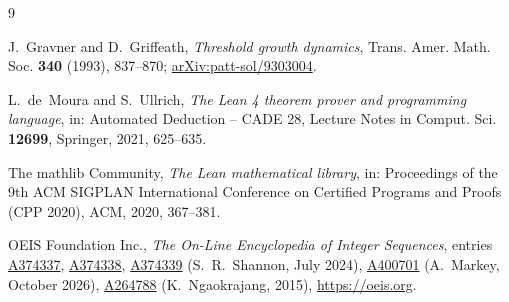 \documentclass[11pt,a4paper]{amsart}
\theoremstyle{definition}
\theoremstyle{remark}
\newcommand{\oeis}[1]{\href{https://oeis.org/#1}{#1}}
\begin{document}
\begin{thebibliography}{9}

J.~Gravner and D.~Griffeath,
\emph{Threshold growth dynamics},
Trans. Amer. Math. Soc. \textbf{340} (1993), 837--870;
\href{https://arxiv.org/abs/patt-sol/9303004}{arXiv:patt-sol/9303004}.

L.~de~Moura and S.~Ullrich,
\emph{The Lean 4 theorem prover and programming language},
in: Automated Deduction -- CADE 28, Lecture Notes in Comput. Sci. \textbf{12699}, Springer, 2021, 625--635.

The mathlib Community,
\emph{The Lean mathematical library},
in: Proceedings of the 9th ACM SIGPLAN International Conference on Certified Programs and Proofs (CPP 2020), ACM, 2020, 367--381.

OEIS Foundation Inc.,
\emph{The On-Line Encyclopedia of Integer Sequences},
entries \oeis{A374337}, \oeis{A374338}, \oeis{A374339} (S.~R.~Shannon, July 2024), \oeis{A400701} (A.~Markey, October 2026), \oeis{A264788} (K.~Ngaokrajang, 2015),
\url{https://oeis.org}.

\end{thebibliography}
\end{document}
